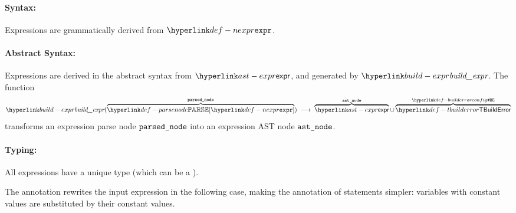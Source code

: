 \paragraph{Syntax:} Expressions are grammatically derived from $\Nexpr$.

\paragraph{Abstract Syntax:} Expressions are derived in the abstract syntax from $\expr$,
and generated by $\buildexpr$.
\hypertarget{build-expr}{}
The function
\[
  \buildexpr(\overname{\parsenode{\Nexpr}}{\vparsednode}) \;\aslto\; \overname{\expr}{\vastnode}
  \cup \overname{\TBuildError}{\BuildErrorConfig}
\]
transforms an expression parse node $\texttt{parsed\_node}$ into an expression AST node $\texttt{ast\_node}$.
\ProseOtherwiseBuildError

\paragraph{Typing:}
All expressions have a unique type (which can be a \tupletypeterm{}).


The annotation rewrites the input expression in the following case, making the annotation of statements simpler:
variables with constant values are substituted by their constant values.

